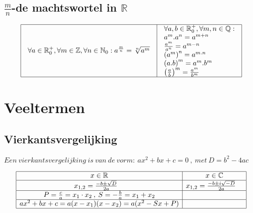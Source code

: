 \documentclass[a5paper]{article}
\begin{document}
\newpage

\subsection{\texorpdfstring{$\frac{m}{n}$-de machtswortel in $\mathbb{R}$}{m/n-de machtswortel in R}}
\[
\begin{array}{|c|c|}
\hline
\begin{array}{l}
\forall a\in\mathbb{R}_0^+,\forall m\in\mathbb{Z},\forall n\in\mathbb{N}_0:a^\frac{m}{n}=\sqrt[n]{a^m}
\end{array} & \begin{array}{l}
\forall a,b\in\mathbb{R}_0^+,\forall m,n\in\mathbb{Q}:\\
a^m.a^n=a^{m+n}\\
\frac{a^m}{a^n}=a^{m-n}\\
\left(a^m\right)^n=a^{m.n}\\
\left(a.b\right)^m=a^m.b^m\\
\left(\frac{a}{b}\right)^m=\frac{a^m}{b^m}
\end{array} \\ 
\hline
\end{array}
\]

\section{Veeltermen}
\subsection{Vierkantsvergelijking}
$Een\:vierkantsvergelijking\:is\:van\:de\:vorm:\:ax^2 + bx + c = 0\:,\:met\:D=b^2 - 4ac $

\renewcommand{\arraystretch}{1.5} %
\[
\begin{array}{|c|c|}
\hline
x\in{\displaystyle \mathbb {R} } & x\in{\displaystyle \mathbb {C} } \\ 
\hline
x_{1,2} = \frac{-b \pm \sqrt{D}}{2a} \quad  & x_{1,2} = \frac{-b \pm i\sqrt{-D}}{2a} \quad \\ 
\hline
P = \frac{c}{a} = x_1 \cdot x_2\:,\:S = -\frac{b}{a} = x_1 + x_2 &  \\ 
\hline
ax^2 + bx + c = a(x - x_1)(x - x_2) = a(x^2 - Sx + P) & \\
\hline
\end{array}
\]
\end{document}
